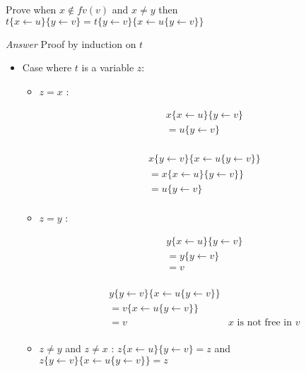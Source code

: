 \documentclass{article}
\theoremstyle{plain}
\theoremstyle{plain}
\begin{document}
  \exo \label{exo:commsubst} Prove when $x\not\in fv(v)$ and $x \not = y$ then
  $t\{x\leftarrow u\}\{y\leftarrow v\} = t\{y\leftarrow v\}\{x\leftarrow u\{y\leftarrow v\}\}$

  \textit{Answer} Proof by induction on $t$
  \begin{itemize}
    \item Case where $t$ is a variable $z$:
      \begin{itemize}
        \item $z = x$ :
          \begin{multicols}{2}
            \begin{align*}
              &x\{x\leftarrow u\}\{y\leftarrow v\} \\
              &= u\{y\leftarrow v\} \\ 
            \end{align*}

            \begin{align*}
              &x\{y\leftarrow v\}\{x\leftarrow u\{y\leftarrow v\}\} \\
              &= x\{x\leftarrow u\}\{y\leftarrow v\}\} \\
              &= u\{y\leftarrow v\} \\
            \end{align*}
          \end{multicols}

        \item $z = y$ :
          \begin{multicols}{2}
            \begin{align*}
              &y\{x\leftarrow u\}\{y\leftarrow v\} \\
              &= y\{y\leftarrow v\} \\
              &= v \\
            \end{align*}

            \begin{align*}
              &y\{y\leftarrow v\}\{x\leftarrow u\{y\leftarrow v\}\} \\
              &= v\{x\leftarrow u\{y\leftarrow v\}\} \\
              &= v & \text{$x$ is not free in $v$} \\
            \end{align*}
          \end{multicols}
        \item $z \not = y$ and $z \not = x$ :
          $z\{x\leftarrow u\}\{y\leftarrow v\} = z$ and
          $z\{y\leftarrow v\}\{x\leftarrow u\{y\leftarrow v\}\} = z$
      \end{itemize}


\end{itemize}
\end{document}
